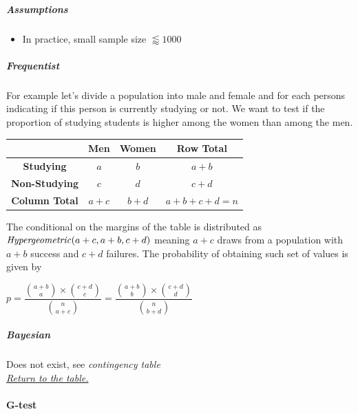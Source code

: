 \subparagraph{Assumptions}
\begin{itemize}
    \item In practice, small sample size $\lessapprox 1000$
\end{itemize}

\subparagraph{Frequentist}
For example let's divide a population into male and female and for each persons indicating
if this person is currently studying or not. We want to test if the proportion of studying
students is higher among the women than among the men.
\begin{center}
    \begin{tabular}{|*{4}{c|}}
    \hline
    & \textbf{Men} & \textbf{Women} & \textbf{Row Total}\\
    \hline
    \textbf{Studying} & $a$ & $b$ & $a+b$ \\
    \hline
    \textbf{Non-Studying} & $c$ & $d$ & $c+d$ \\
    \hline
    \textbf{Column Total} & $a+c$ & $b+d$ & $a + b + c + d = n$ \\
    \hline
    \end{tabular}
\end{center}
The conditional on the margins of the table is distributed as $\text{\emph{Hypergeometric}}(a+c, a+b, c+d)$ meaning $a + c$ draws from a population with $a + b$ success and $c+d$ 
failures.
The probability of obtaining such set of values is given by
\begin{center}
    $p = \dfrac{{{a+b}\choose{a}}\times{{c+d}\choose{c}}}{{{n}\choose{a+c}}}
    = \dfrac{{{a+b}\choose{b}}\times{{c+d}\choose{d}}}{{{n}\choose{b+d}}}$
\end{center}

\subparagraph{Bayesian}
Does not exist, see \emph{contingency table} \\

\textit{\hyperref[statistical_method_table]{Return to the table.}}


\paragraph{G-test}

